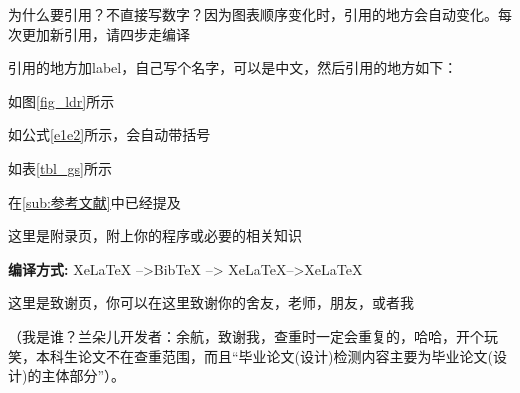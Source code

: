 \documentclass[AutoFakeBold]{LZUThesis}
\begin{document}
为什么要引用？不直接写数字？因为图表顺序变化时，引用的地方会自动变化。每次更加新引用，请四步走编译

引用的地方加label，自己写个名字，可以是中文，然后引用的地方如下：

如图\ref{fig_ldr}所示

如公式\eqref{e1e2}所示，会自动带括号

如表\ref{tbl_gs}所示

在\ref{sub:参考文献}中已经提及


\backmatter


\printbib



\Appendix


这里是附录页，附上你的程序或必要的相关知识

{\bfseries 编译方式:} XeLaTeX -->BibTeX --> XeLaTeX-->XeLaTeX


\Thanks

这里是致谢页，你可以在这里致谢你的舍友，老师，朋友，或者我

（我是谁？兰朵儿开发者：余航，致谢我，查重时一定会重复的，哈哈，开个玩笑，本科生论文不在查重范围，而且“毕业论文(设计)检测内容主要为毕业论文(设计)的主体部分”）。


\Grade %
\end{document}

